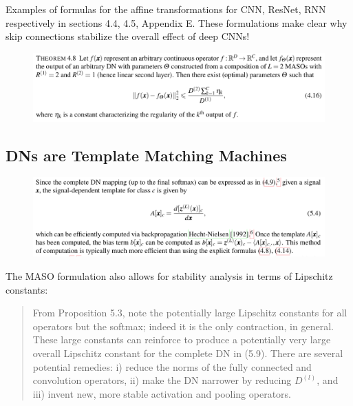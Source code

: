 \documentclass{article}
\begin{document}
Examples of formulas for the affine transformations for CNN, ResNet, RNN respectively in sections 4.4, 4.5, Appendix E. These formulations make clear why skip connections stabilize the overall effect of deep CNNs!


\begin{figure}[h]
	\begin{center}
		\includegraphics[width=.8\linewidth]{Figure/prop4p8}
		\label{fig:prop4p8}
	\end{center}
\end{figure}



\subsection{DNs are Template Matching Machines}


\begin{figure}[h]
	\begin{center}
		\includegraphics[width=.8\linewidth]{Figure/def_xdeptemplate}
		\label{fig:def_xdeptemplate}
	\end{center}
\end{figure}


The MASO formulation also allows for stability analysis in terms of Lipschitz constants:

\begin{quote}	
	From Proposition 5.3, note the potentially large Lipschitz constants for all operators but the softmax; indeed it is the only contraction, in general. These large constants can reinforce to produce a potentially very large overall Lipschitz constant for the complete DN in (5.9). There are several potential remedies: i) reduce the norms of the fully connected and convolution operators, ii) make the DN narrower by reducing $D^{(l)}$, and iii) invent new, more stable activation and pooling operators.
\end{quote}
\end{document}
